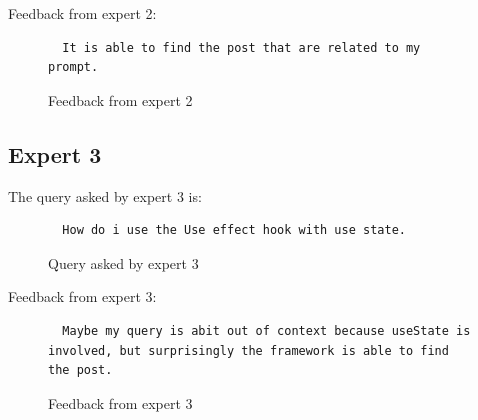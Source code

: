 Feedback from expert 2:
\begin{figure}[H]
\noindent\begin{lstlisting}
  It is able to find the post that are related to my prompt.
\end{lstlisting}
\caption{Feedback from expert 2}
\label{fig:feedback-from-expert-2}
\end{figure}

\subsection{Expert 3} \label{survey_expert_3}
The query asked by expert 3 is:

\begin{figure}[H]
\noindent\begin{lstlisting}
  How do i use the Use effect hook with use state.
\end{lstlisting}
\caption{Query asked by expert 3}
\label{fig:query-asked-by-expert-3}
\end{figure}

Feedback from expert 3:
\begin{figure}[H]
\noindent\begin{lstlisting}
  Maybe my query is abit out of context because useState is involved, but surprisingly the framework is able to find the post.
\end{lstlisting}
\caption{Feedback from expert 3}
\label{fig:feedback-from-expert-3}
\end{figure}


